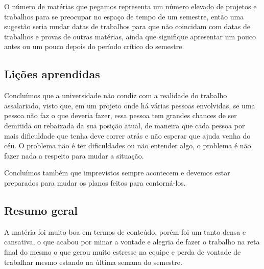 O número de matérias que pegamos representa um número elevado de projetos e trabalhos para se preocupar no espaço de tempo de um semestre, então uma sugestão seria mudar datas de trabalhos para que não coincidam com datas de trabalhos e provas de outras matérias, ainda que signifique apresentar um pouco antes ou um pouco depois do período crítico do semestre.

\subsection{Lições aprendidas}
Concluímos que a universidade não condiz com a realidade do trabalho assalariado, visto que, em um projeto onde há várias pessoas envolvidas, se uma pessoa não faz o que deveria fazer, essa pessoa tem grandes chances de ser demitida ou rebaixada da sua posição atual, de maneira que cada pessoa por mais dificuldade que tenha deve correr atrás e não esperar que ajuda venha do céu. O problema não é ter dificuldades ou não entender algo, o problema é não fazer nada a respeito para mudar a situação.

Concluímos também que imprevistos sempre acontecem e devemos estar preparados para mudar os planos feitos para contorná-los. 

\subsection{Resumo geral}
A matéria foi muito boa em termos de conteúdo, porém foi um tanto densa e cansativa, o que acabou por minar a vontade e alegria de fazer o trabalho na reta final do mesmo o que gerou muito estresse na equipe e perda de vontade de trabalhar mesmo estando na última semana do semestre.



